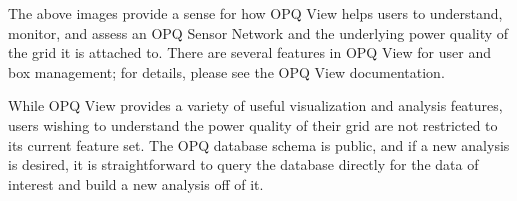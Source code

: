 The above images provide a sense for how OPQ View helps users to understand, monitor, and assess an OPQ Sensor Network and the underlying power quality of the grid it is attached to. There are several features in OPQ View for user and box management; for details, please see the OPQ View documentation.

While OPQ View provides a variety of useful visualization and analysis features, users wishing to understand the power quality of their grid are not restricted to its current feature set. The OPQ database schema is public, and if a new analysis is desired, it is straightforward to query the database directly for the data of interest and build a new analysis off of it.




